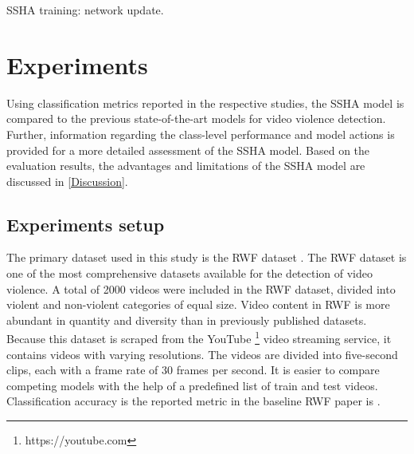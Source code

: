 \documentclass[review]{elsarticle}
\begin{document}
\begin{algorithm}
  \caption{SSHA training: network update.}
  \label{alg:update}
\end{algorithm}


\section{Experiments}
\label{Experiments}


Using classification metrics reported in the respective studies, the SSHA model is compared to the previous state-of-the-art models for video violence detection. Further, information regarding the class-level performance and model actions is provided for a more detailed assessment of the SSHA model. Based on the evaluation results, the advantages and limitations of the SSHA model are discussed in \autoref{Discussion}.

\subsection{Experiments setup}

The primary dataset used in this study is the RWF dataset \citep{cheng2021rwf}. The RWF dataset is one of the most comprehensive datasets available for the detection of video violence. A total of 2000 videos were included in the RWF dataset, divided into violent and non-violent categories of equal size. Video content in RWF is more abundant in quantity and diversity than in previously published datasets. Because this dataset is scraped from the YouTube \footnote{https://youtube.com} video streaming service, it contains videos with varying resolutions. The videos are divided into five-second clips, each with a frame rate of 30 frames per second. It is easier to compare competing models with the help of a predefined list of train and test videos. Classification accuracy is the reported metric in the baseline RWF paper is \citep{cheng2021rwf}.
\end{document}
